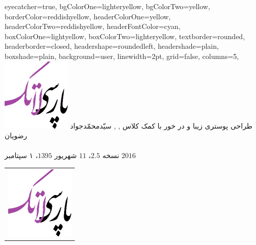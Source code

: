 \documentclass[landscape,debug,paperwidth=1510mm, paperheight=955mm,]{xebaposter}
\begin{document}
      \begin{poster}%
      {
      eyecatcher=true,
      bgColorOne=lighteryellow,%
      bgColorTwo=yellow,
      borderColor=reddishyellow,
      headerColorOne=yellow,
      headerColorTwo=reddishyellow,
      headerFontColor=cyan,
      boxColorOne=lightyellow,      
      boxColorTwo=lighteryellow,
      textborder=rounded,
      headerborder=closed,
      headershape=roundedleft,
      headershade=plain,
      boxshade=plain,
      background=user,
      linewidth=2pt,
      grid=false, %
      columns=5,
      }
 {
      \includegraphics[height=0.05\textheight]{logo}
 }
 {طراحی پوستری زیبا و در خور با کمک کلاس 
}
 {\large {}, , سیّدمحمّدجواد رضویان
 \\%
 {\normalsize\texttt{}
 \\
نسخه $2.5$، $11$ شهریور $1395$، ۱ سپتامبر $2016$
 }}
 {
\begin{tabular}{r}
    \includegraphics[height=0.05 \textheight]{logo}\\
\end{tabular}
 }


\end{poster}
\end{document}
